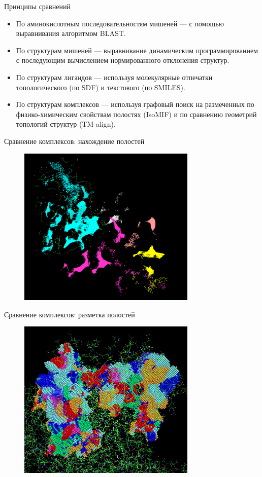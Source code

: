 \documentclass[14pt]{beamer}
\begin{document}
\begin{frame}{Принципы сравнений}
	\small
	\begin{itemize}
	\item По аминокислотным последовательностям мишеней --- с помощью выравнивания алгоритмом BLAST.
	\item По структурам мишеней --- выравнивание динамическим программированием с последующим вычислением нормированного отклонения структур.
	\item По структурам лигандов --- используя молекулярные отпечатки топологического (по SDF) и текстового (по SMILES).
	\item По структурам комплексов --- используя графовый поиск на размеченных по физико-химическим свойствам полостях (IsoMIF) и по сравнению геометрий топологий структур (TM-align).
	\end{itemize}
\end{frame}

\begin{frame}{Сравнение комплексов: нахождение полостей}
	\begin{figure}
		\centering
		\includegraphics[width=85mm]{../pictures/clefts}		
	\end{figure}
\end{frame}

\begin{frame}{Сравнение комплексов: разметка полостей}
	\begin{figure}
		\centering
		\includegraphics[width=85mm]{../pictures/mif}
\end{figure}
\end{frame}
\end{document}

